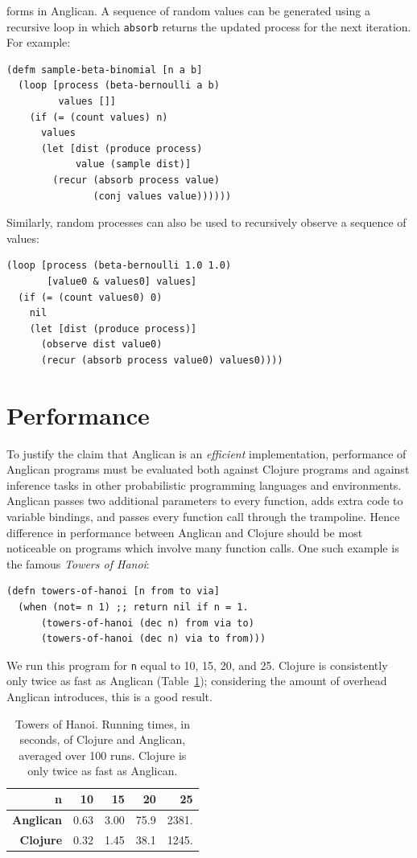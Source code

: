 \documentclass[preprint]{sigplanconf}
\begin{document}
forms in Anglican. A sequence of random values can be generated
using a recursive loop in which \texttt{absorb} returns the
updated process for the next iteration. For example:
\begin{lstlisting}[style=default]
(defm sample-beta-binomial [n a b]
  (loop [process (beta-bernoulli a b)
         values []]
    (if (= (count values) n)
      values
      (let [dist (produce process)
            value (sample dist)]
        (recur (absorb process value)
               (conj values value))))))
\end{lstlisting}
Similarly, random processes can also be used to recursively
observe a sequence of values:
\begin{lstlisting}[style=default]
(loop [process (beta-bernoulli 1.0 1.0)
       [value0 & values0] values] 
  (if (= (count values0) 0)
    nil
    (let [dist (produce process)]
      (observe dist value0)
      (recur (absorb process value0) values0))))
\end{lstlisting}

\section{Performance}

To justify the claim that Anglican is an \textit{efficient}
implementation, performance of Anglican programs must be evaluated
both against Clojure programs and against inference tasks in
other probabilistic programming languages and environments.
Anglican passes two additional parameters to every function, adds
extra code to variable bindings, and passes every function
call through the trampoline. Hence difference in performance
between Anglican and Clojure should be most noticeable on
programs which involve many function calls. One such example is
the famous \textit{Towers of Hanoi}:

\begin{lstlisting}[style=default]
(defn towers-of-hanoi [n from to via]
  (when (not= n 1) ;; return nil if n = 1.
      (towers-of-hanoi (dec n) from via to)
      (towers-of-hanoi (dec n) via to from)))
\end{lstlisting}

We run this program for \texttt{n} equal to 10, 15, 20, and 25. Clojure
is consistently only twice as fast as Anglican
(Table~\ref{tbl:hanoi}); considering the amount of overhead
Anglican introduces, this is a good result.
\begin{table}
    \centering
    \begin{tabular}{r|r|r|r|r}
        {\bf n}  & 10 & 15 & 20 & 25 \\ \hline
        {\bf Anglican} & 0.63 & 3.00 & 75.9 & 2381.  \\ \hline
        {\bf Clojure} &  0.32 & 1.45 & 38.1  &  1245.
    \end{tabular}
    \caption{Towers of Hanoi. Running times, in
    seconds, of Clojure and Anglican, averaged over 100 runs.
    Clojure is only twice as fast as Anglican.}
    \label{tbl:hanoi}
\end{table}
\end{document}
